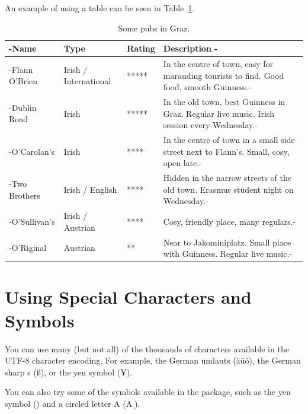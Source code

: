 An example of using a table can be seen in Table~\ref{tab:SomePubs}.

\begin{table}[tp]
\tablestretch
{}
\centering
\begin{tabularx}{\linewidth}
{>{\kern-\tabcolsep}lllX<{\kern-\tabcolsep}}
\toprule
\textbf{Name} & \textbf{Type} & \textbf{Rating} & \textbf{Description} \\
\midrule
Flann O'Brien & Irish / International & ***** &
In the centre of town, easy for
marauding tourists to find. Good food, smooth Guinness.\\
%
Dublin Road & Irish & ***** &
In the old town, best Guinness in Graz.
Regular live music. Irish session every Wednesday.\\
%
O'Carolan's & Irish & **** &
In the centre of town in a small side street next to Flann's.
Small, cosy, open late.\\
%
Two Brothers & Irish / English & **** &
Hidden in the narrow streets of the old town.
Erasmus student night on Wednesday.\\
%
O'Sullivan's & Irish / Austrian & **** &
Cosy, friendly place, many regulars.\\
%
O'Riginal & Austrian & ** &
Near to Jakominiplatz.
Small place with Guinness. Regular live music.\\
\bottomrule
\end{tabularx}

\caption[Some Pubs in Graz]
{
Some pubs in Graz.
}
\label{tab:SomePubs}
\end{table}








\section{Using Special Characters and Symbols}

You can use many (but not all) of the thousands of characters
available in the UTF-8 \parencites{Wikipedia-UTF8}{Unicode-Charts}
character encoding. For example, the German umlauts (äüö), the German
sharp s (ß), or the yen symbol (¥).

You can also try some of the  symbols available
in the  package, such as the yen symbol (\textyen) and
a circled letter A (\textcircled{A}).





